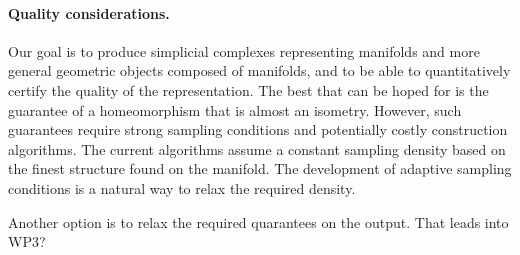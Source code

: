 

\paragraph{Quality considerations.}
Our goal is to produce simplicial complexes representing manifolds and
more general geometric objects composed of manifolds, and to be able
to quantitatively certify the quality of the representation. The best
that can be hoped for is the guarantee of a homeomorphism that is
almost an isometry. However, such guarantees require strong sampling
conditions and potentially costly construction algorithms. The current
algorithms assume a constant sampling density based on the finest
structure found on the manifold. The development of adaptive sampling
conditions is a natural way to relax the required density. 

Another option is to relax the required quarantees on the output. That
leads into WP3?
